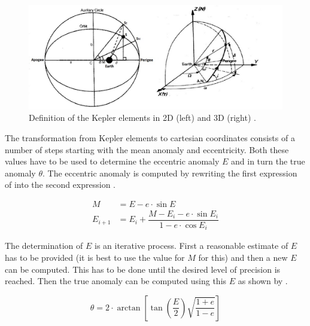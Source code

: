 
\begin{figure}[!ht]
\centering
\includegraphics[width=1.0\textwidth]{figures/reference_frames/kepler_noomen2013basic_akcasu2013.jpg}
\caption{Definition of the Kepler elements in 2D (left) and 3D (right) \citep{noomen2013basic,akcasu2013}.}
\label{fig:kepler_noomen2013basic_akcasu2013_1}
\end{figure}

\noindent
The transformation from Kepler elements to cartesian coordinates consists of a number of steps starting with the mean anomaly and eccentricity. Both these values have to be used to determine the eccentric anomaly $E$ and in turn the true anomaly $\theta$. The eccentric anomaly is computed by rewriting the first expression of  into the second expression \citep{noomen2013basic}. 



\begin{equation}\label{eq:mandecomp}
\begin{split}
 M&=E-e\cdot\sin{E}\\
 E_{i+1}&=E_{i}+\dfrac{M-E_{i}-e\cdot\sin{E_{i}}}{1-e\cdot\cos E_{i}}
\end{split}
\end{equation}

\noindent
The determination of $E$ is an iterative process. First a reasonable estimate of $E$ has to be provided (it is best to use the value for $M$ for this) and then a new $E$ can be computed. This has to be done until the desired level of precision is reached. Then the true anomaly can be computed using this $E$ as shown by .

\begin{equation}\label{eq:etothetacomp}
\theta=2\cdot\arctan\left[\tan\left(\dfrac{E}{2}\right)\sqrt{\dfrac{1+e}{1-e}}\right]
\end{equation}

